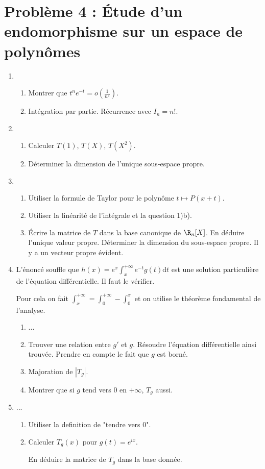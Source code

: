 \documentclass[twoside,french,11pt]{VcCours}
\newcommand{\dt}{\text{d}t}
\begin{document}
\section*{Problème 4 : Étude d'un endomorphisme sur un espace de polynômes}
  \begin{enumerate}
  \item 
  \begin{enumerate}
  \item Montrer que $t^ne^{-t}=o\left(\frac{1}{n^2}\right)$.
  \item Intégration par partie. Récurrence avec $I_n=n!$.
  \end{enumerate}
  \item \begin{enumerate}
  \item Calculer $T(1)$, $T(X)$, $T(X^2)$.
  \item Déterminer la dimension de l'unique sous-espace propre.
  \end{enumerate}
  \item \begin{enumerate}
  \item Utiliser la formule de Taylor pour le polynôme $t\mapsto P(x+t)$.
  \item Utiliser la linéarité de l'intégrale et la question 1)b).
  \item Écrire la matrice de $T$ dans la base canonique de $\R_n[X]$. 
  En déduire l'unique valeur propre. Déterminer la dimension du sous-espace propre. Il y a un vecteur propre évident.
  \end{enumerate}
  \item L'énoncé souffle que $h(x)=e^x \int_x^{+ \infty} e^{-t} g(t) \dt$ est une solution particulière de l'équation différentielle. Il faut le vérifier.

  Pour cela on fait $\int_{x}^{+\infty}=\int_{0}^{+\infty}-\int_{0}^{x}$ et on utilise le théorème fondamental de l'analyse. 
  \begin{enumerate}
  \item ...
  \item Trouver une relation entre $g'$ et $g$. Résoudre l'équation différentielle ainsi trouvée. Prendre en compte le fait que $g$ est borné.
  \item Majoration de $|T_g|$.
  \item Montrer que si $g$ tend vers $0$ en $+ \infty$, $T_g$ aussi.
  \end{enumerate}
  \item ...
  \begin{enumerate}
  \item Utiliser la definition de "tendre vers $0$".
  \item Calculer $T_g(x)$ pour $g(t)=e^{ix}$.
  
  En déduire la matrice de $T_g$ dans la base donnée.
  \end{enumerate}
  \end{enumerate}
  
\end{document}
